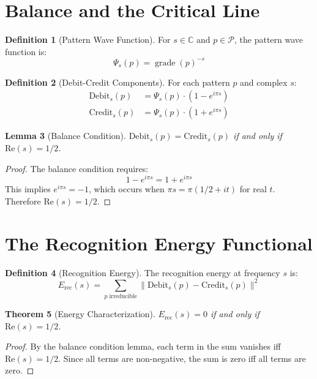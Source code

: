 \documentclass[12pt]{article}
\newtheorem{theorem}{Theorem}[section]
\newtheorem{lemma}[theorem]{Lemma}
\theoremstyle{definition}
\newtheorem{definition}[theorem]{Definition}
\theoremstyle{remark}
\newcommand{\C}{\mathbb{C}}
\DeclareMathOperator{\grade}{grade}
\begin{document}
\section{Balance and the Critical Line}

\begin{definition}[Pattern Wave Function]
For $s \in \C$ and $p \in \mathcal{P}$, the pattern wave function is:
$$\Psi_s(p) = \grade(p)^{-s}$$
\end{definition}

\begin{definition}[Debit-Credit Components]
For each pattern $p$ and complex $s$:
\begin{align}
\text{Debit}_s(p) &= \Psi_s(p) \cdot (1 - e^{i\pi s})\\
\text{Credit}_s(p) &= \Psi_s(p) \cdot (1 + e^{i\pi s})
\end{align}
\end{definition}

\begin{lemma}[Balance Condition]
$\text{Debit}_s(p) = \text{Credit}_s(p)$ if and only if $\text{Re}(s) = 1/2$.
\end{lemma}

\begin{proof}
The balance condition requires:
$$1 - e^{i\pi s} = 1 + e^{i\pi s}$$
This implies $e^{i\pi s} = -1$, which occurs when $\pi s = \pi(1/2 + it)$ for real $t$. Therefore $\text{Re}(s) = 1/2$.
\end{proof}

\section{The Recognition Energy Functional}

\begin{definition}[Recognition Energy]
The recognition energy at frequency $s$ is:
$$E_{\text{rec}}(s) = \sum_{p \text{ irreducible}} \|\text{Debit}_s(p) - \text{Credit}_s(p)\|^2$$
\end{definition}

\begin{theorem}[Energy Characterization]
$E_{\text{rec}}(s) = 0$ if and only if $\text{Re}(s) = 1/2$.
\end{theorem}

\begin{proof}
By the balance condition lemma, each term in the sum vanishes iff $\text{Re}(s) = 1/2$. Since all terms are non-negative, the sum is zero iff all terms are zero.
\end{proof}
\end{document}
